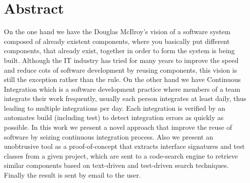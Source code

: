 \chapter{Abstract}
On the one hand we have the Douglas McIlroy's vision \cite{McIlroy1968} of a software system composed of already existent components, where you basically put different components, that already exist, together in order to form the system is being built. Although the IT industry has tried for many years to improve the speed and reduce cots of software development by reusing components, this vision is still the exception rather than the rule. On the other hand we have Continuous Integration which is a software development practice where members of a team integrate their work frequently, usually each person integrates at least daily, thus leading to multiple integrations per day. Each integration is verified by an automates build (including test) to detect integration errors as quickly as possible. In this work we present a novel approach that improve the reuse of software by seizing continuous integration process. Also we present an unobtrusive tool as a proof-of-concept that extracts interface signatures and test classes from a given project, which are sent to a code-search engine to retrieve similar components based on text-driven and test-driven search techniques. Finally the result is sent by email to the user.